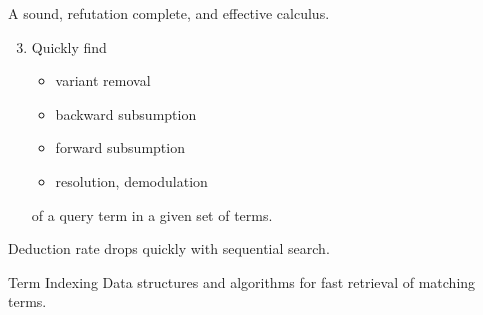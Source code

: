 

\begin{goal}
	A sound, refutation complete, and {effective} calculus.\\[0.5em]
	\pause
	\begin{enumerate}
		\setcounter{enumi}{2}
		\item Quickly find
\begin{itemize}
\pause
\item {} \hfill{\colG\footnotesize variant removal}
%
\pause
\item {}   \hfill{\colG\footnotesize backward subsumption}\\
\pause
\item {}  \hfill{\colG\footnotesize forward subsumption}\\
\pause
\item {} \hfill{\colG\footnotesize resolution, demodulation}\\

\end{itemize}
\pause
of a query term in a given set of terms.
\end{enumerate}

\end{goal}

\pause
	\begin{observation}
		Deduction rate drops quickly with sequential search.
	\end{observation}
	
\pause	
	
	\begin{block}{Term Indexing}
		Data structures and algorithms for fast retrieval of matching terms.
	\end{block}